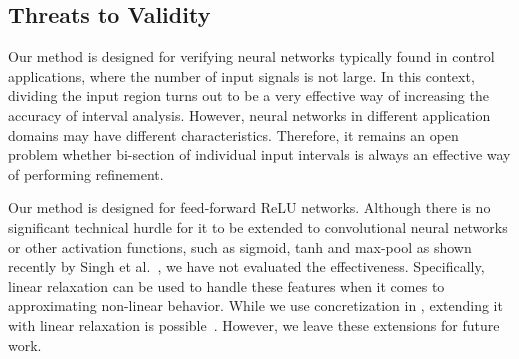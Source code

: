 \subsection{Threats to Validity}


Our method is designed for verifying neural networks typically found
in control applications, where the number of input signals is not
large. In this context, dividing the input region turns out to be a
very effective way of increasing the accuracy of interval analysis.
However, neural networks in different application domains may have
different characteristics.  Therefore, it remains an open problem
whether bi-section of individual input intervals is always an
effective way of performing refinement.


Our method is designed for feed-forward ReLU networks.  Although there
is no significant technical hurdle for it to be extended to
convolutional neural networks or other activation functions, such as
sigmoid, tanh and max-pool as shown recently by Singh et
al.~\cite{SinghGPV19}, we have not evaluated the effectiveness.
Specifically, linear relaxation can be used to handle these features
when it comes to approximating non-linear behavior.  While we use
concretization in \diffNN{}, extending it with linear relaxation is
possible~\cite{WangPWYJ18nips}. However, we leave these extensions for
future work.


